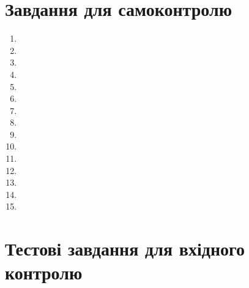 \documentclass[twocolumn]{el-author}
\begin{document}
\section{Завдання для самоконтролю}

\begin{enumerate}
	\item 
	\item 
	\item 
	\item 
	\item 
	\item 
	\item 
	\item 
	\item 
	\item 
	\item 
	\item 
	\item 
	\item 
	\item 
\end{enumerate}

\clearpage
\section{Тестові завдання для вхідного контролю}
\end{document}
